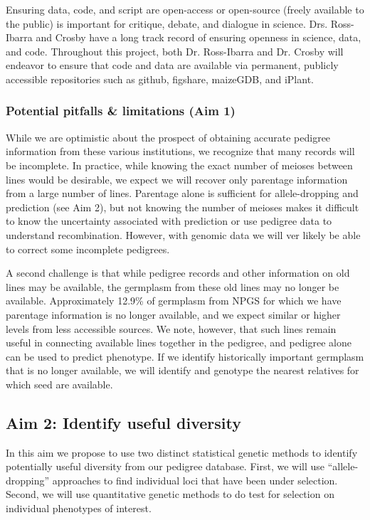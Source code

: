 \documentclass[12pt]{article}
\begin{document}
Ensuring data, code, and script are open-access or open-source (freely available to the public) is important for critique, debate, and dialogue in science. 
Drs. Ross-Ibarra and Crosby have a long track record of ensuring openness in science, data, and code. 
Throughout this project, both Dr. Ross-Ibarra and Dr. Crosby will endeavor to ensure that code and data are available via permanent, publicly accessible repositories such as github, figshare, maizeGDB, and iPlant.

\subsubsection*{Potential pitfalls \& limitations (Aim 1)}

While we are optimistic about the prospect of obtaining accurate pedigree information from these various institutions, we recognize that many records will be incomplete. 
In practice, while knowing the exact number of meioses between lines would be desirable, we expect we will recover only parentage information from a large number of lines. 
Parentage alone is sufficient for allele-dropping and prediction (see Aim 2), but not knowing the number of meioses makes it difficult to know the uncertainty associated with prediction or use pedigree data to understand recombination. However, with genomic data we will ver likely be able to correct some incomplete pedigrees.
 
A second challenge is that while pedigree records and other information on old lines may be available, the germplasm from these old lines may no longer be available. 
Approximately 12.9\% of germplasm from NPGS for which we have parentage information is no longer available, and we expect similar or higher levels from less accessible sources. 
We note, however, that such lines remain useful in connecting available lines together in the pedigree, and pedigree alone can be used to predict phenotype. 
If we identify historically important germplasm that is no longer available, we will identify and genotype the nearest relatives for which seed are available. 

\subsection*{Aim 2: Identify useful diversity}

In this aim we propose to use two distinct statistical genetic methods to identify potentially useful diversity from our pedigree database.  
First, we will use ``allele-dropping'' approaches to find individual loci that have been under selection.
Second, we will use quantitative genetic methods to do test for selection on individual phenotypes of interest.
\end{document}

